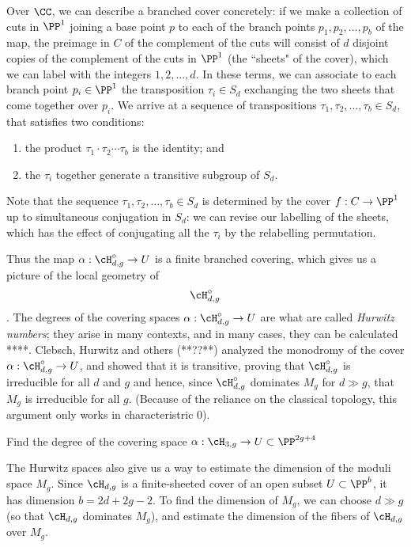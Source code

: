 Over $\CC$, we can describe a branched cover concretely: if we make a collection of cuts in $\PP^1$ joining a base point $p$ to each of the branch points $p_1, p_2, \dots, p_b$ of the map, the preimage in $C$ of the complement of the cuts will consist of $d$ disjoint copies of the complement of the cuts in $\PP^1$ (the ``sheets" of the cover), which we can label with the integers $1, 2, \dots, d$. In these terms, we can associate to each branch point $p_i \in \PP^1$ the transposition $\tau_i \in S_d$ exchanging the two sheets that come together over $p_i$. We arrive at a sequence of transpositions $\tau_1, \tau_2, \dots, \tau_b \in S_d$, that satisfies two conditions:

\begin{enumerate}
\item the product $\tau_1\cdot \tau_2 \cdots \tau_b$ is the identity; and
\item the $\tau_i$ together generate a transitive subgroup of $S_d$.
\end{enumerate}

Note that the sequence $\tau_1, \tau_2, \dots, \tau_b \in S_d$ is determined by the cover $f : C \to \PP^1$ up to simultaneous conjugation in $S_d$: we can revise our labelling of the sheets, which has the effect of conjugating all the $\tau_i$ by the relabelling permutation.

Thus the map $\alpha : \cH^\circ_{d,g} \to U$ is a finite branched covering, which gives us a picture of the local geometry of $$\cH^\circ_{d,g}$$. 
The degrees of the covering spaces $\alpha : \cH^\circ_{d,g} \to U$ are what are called \emph{Hurwitz numbers}; they arise in many contexts, and in many cases, they can be calculated **\cite{}**. Clebsch, Hurwitz and others (**??**) analyzed the monodromy of the cover $\alpha : \cH^\circ_{d,g} \to U$, and showed that it is transitive, proving that $\cH^\circ_{d,g}$ is irreducible for all $d$ and $g$ and hence, since $\cH^\circ_{d,g}$ dominates $M_g$ for $d \gg g$, that $M_g$ is irreducible for all $g$. (Because of the reliance on the classical topology, this argument only works in characteristric 0).
\begin{exercise}
Find the degree of the covering space $\alpha : \cH_{3,g} \to U \subset \PP^{2g+4}$
\end{exercise}

The Hurwitz spaces also give us a way to estimate the dimension of the moduli space $M_g$. Since $\cH_{d,g}$ is a finite-sheeted cover of an open subset $U \subset \PP^b$, it has dimension  $b = 2d+2g-2$. To find the dimension of $M_g$, we can choose $d \gg g$ (so that $\cH_{d,g}$ dominates $M_g$), and estimate the dimension of the fibers of $\cH_{d,g}$ over $M_g$.

